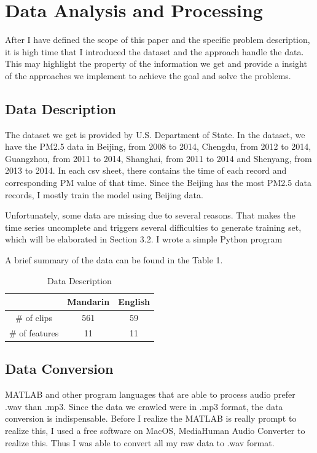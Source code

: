 \documentclass{sig-alternate}
\begin{document}
\section{Data Analysis and Processing}
After I have defined the scope of this paper and the specific problem description, it is high time that I introduced the dataset and the approach handle the data. This may highlight the property of the information we get and provide a insight of the approaches we implement to achieve the goal and solve the problems.

\subsection{Data Description}
The dataset we get is provided by U.S. Department of State\cite{data}. In the dataset, we have the PM2.5 data in Beijing, from 2008 to 2014, Chengdu, from 2012 to 2014, Guangzhou, from 2011 to 2014, Shanghai, from 2011 to 2014 and Shenyang, from 2013 to 2014. In each csv sheet, there contains the time of each record and corresponding PM value of that time. Since the Beijing has the most PM2.5 data records, I mostly train the model using Beijing data.

Unfortunately, some data are missing due to several reasons. That makes the time series uncomplete and triggers several difficulties to generate training set, which will be elaborated in Section 3.2. I wrote a simple Python program

A brief summary of the data can be found in the Table 1.

\begin{table}[ht]
\centering
\caption{Data Description}
\begin{tabular}{|c|c|c|} \hline
&Mandarin&English\\ \hline
\# of clips&561 &59 \\ \hline
\# of features&11 &11 \\ \hline

\end{tabular}
\end{table}

\subsection{Data Conversion}
MATLAB and other program languages that are able to process audio prefer .wav than .mp3. Since the data we crawled were in .mp3 format, the data conversion is indispensable. Before I realize the MATLAB is really prompt to realize this, I used a free software on MacOS, MediaHuman Audio Converter\cite{convert} to realize this. Thus I was able to convert all my raw data to .wav format.
\end{document}
